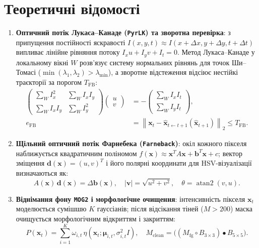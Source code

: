 \documentclass[14pt, a4paper]{extarticle}
\begin{document}
\section{Теоретичні відомості}
\begin{enumerate}
    \item \textbf{Оптичний потік Лукаса--Канаде (\texttt{PyrLK}) та зворотна перевірка}: з припущення постійності яскравості $I(x,y,t) \approx I(x+\Delta x, y+\Delta y, t+\Delta t)$ випливає лінійне рівняння потоку $I_x u + I_y v + I_t = 0$. Метод Лукаса--Канаде у локальному вікні $W$ розв'язує систему нормальних рівнянь для точок Ши--Томасі ($\min(\lambda_1, \lambda_2) > \lambda_{\min}$), а зворотне відстеження відсіює нестійкі траєкторії за порогом $T_{\text{FB}}$:
    \begin{equation}\label{eq:lk}
    \begin{split}
        \begin{pmatrix} \sum_W I_x^2 & \sum_W I_x I_y \\ \sum_W I_x I_y & \sum_W I_y^2 \end{pmatrix} \begin{pmatrix} u \\ v \end{pmatrix} &= -\begin{pmatrix} \sum_W I_x I_t \\ \sum_W I_y I_t \end{pmatrix}, \\
        e_{\text{FB}} &= \left\| \mathbf{x}_t - \hat{\mathbf{x}}_{t \leftarrow t+1}\!\left(\hat{\mathbf{x}}_{t+1}\right) \right\|_2 \le T_{\text{FB}}.
    \end{split}
    \end{equation}

    \item \textbf{Щільний оптичний потік Фарнебека (\texttt{Farneback})}: окіл кожного пікселя наближується квадратичним поліномом $f(\mathbf{x}) \approx \mathbf{x}^T A \mathbf{x} + \mathbf{b}^T \mathbf{x} + c$; вектор зміщення $\mathbf{d}(\mathbf{x}) = (u, v)^T$ і його полярні координати для HSV-візуалізації визначаються як:
    \begin{equation}\label{eq:farneback}
        A(\mathbf{x})\,\mathbf{d}(\mathbf{x}) = \Delta\mathbf{b}(\mathbf{x}), \quad |\mathbf{v}| = \sqrt{u^2 + v^2}, \quad \theta = \operatorname{atan2}(v, u).
    \end{equation}

    \item \textbf{Віднімання фону \texttt{MOG2} і морфологічне очищення}: інтенсивність пікселя $\mathbf{x}_t$ моделюється сумішшю $K$ гауссіанів; після відсікання тіней ($M > 200$) маска очищується морфологічним відкриттям і закриттям:
    \begin{equation}\label{eq:mog2}
        P(\mathbf{x}_t) = \sum_{i=1}^{K} \omega_{i,t}\,\eta(\mathbf{x}_t; \boldsymbol{\mu}_{i,t}, \sigma_{i,t}^2 I), \quad
        M_{\text{clean}} = \bigl((M_{\text{fg}} \circ B_{3\times 3}) \bullet B_{5\times 5}\bigr).
    \end{equation}


\end{enumerate}
\end{document}
